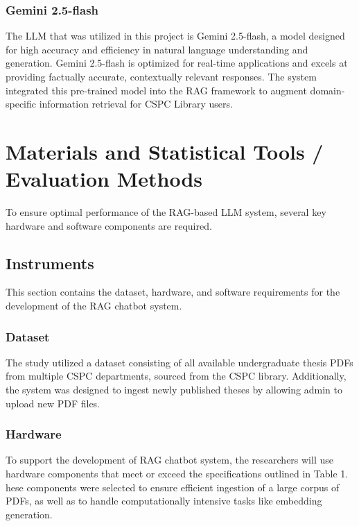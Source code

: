 \begin{refsection}
\subsubsection{Gemini 2.5-flash}

The LLM that was utilized in this project is Gemini 2.5-flash, a model designed for high accuracy and efficiency in natural language understanding and generation. Gemini 2.5-flash is optimized for real-time applications and excels at providing factually accurate, contextually relevant responses. The system integrated this pre-trained model into the RAG framework to augment domain-specific information retrieval for CSPC Library users.

\section{Materials and Statistical Tools / Evaluation Methods}

To ensure optimal performance of the RAG-based LLM system, several key hardware and software components are required.

\subsection{Instruments}

This section contains the dataset, hardware, and software requirements for the development of the RAG chatbot system.

\subsubsection{Dataset}

The study utilized a dataset consisting of all available undergraduate thesis PDFs from multiple CSPC departments, sourced from the CSPC library. Additionally, the system was designed to ingest newly published theses by allowing admin to upload new PDF files.

\subsubsection{Hardware}

To support the development of RAG chatbot system, the researchers will use hardware components that meet or exceed the specifications outlined in Table 1. hese components were selected to ensure efficient ingestion of a large corpus of PDFs, as well as to handle computationally intensive tasks like embedding generation.


\end{refsection}
